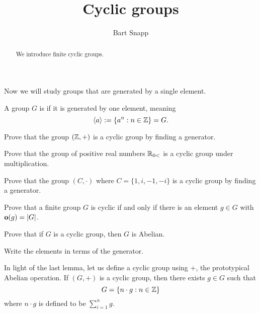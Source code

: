 \documentclass{ximera}
\author{Bart Snapp}
\title{Cyclic groups}
\begin{document}
\begin{abstract}
  We introduce finite cyclic groups.
\end{abstract}
\maketitle

Now we will study groups that are generated by a single element. 

\begin{definition}
  A group $G$ is  if it is generated by one element,
  meaning
  \[
  \langle a\rangle := \{a^n:n\in \mathbb Z\} = G.
  \]
\end{definition}


\begin{exercise}
  Prove that the group $(\mathbb Z,+)$ is a cyclic group by finding a
  generator.
\end{exercise}

\begin{exercise}
  Prove that the group of positive real numbers $\mathbb R_{0<}$ is a cyclic
  group under multiplication.
\end{exercise}


\begin{exercise}
  Prove that the group $(C,\cdot)$ where $C=\{1,i,-1,-i\}$ is a cyclic
  group by finding a generator.
\end{exercise}


\begin{exercise}
  Prove that a finite group $G$ is cyclic if and only if there is an element
  $g\in G$ with $\mathbf o(g) = |G|$.
\end{exercise}



\begin{lemma}
  Prove that if $G$ is a cyclic group, then $G$ is Abelian.
  \begin{sketch}
    Write the elements in terms of the generator.
  \end{sketch}
\end{lemma}

In light of the last lemma, let us define a cyclic group using $+$, the
prototypical Abelian operation. If $(G,+)$ is a cyclic group, then
there exists $g\in G$ such that
\[
G = \{n\cdot g: n\in \mathbb Z\}
\]
where $n\cdot g$ is defined to be $\sum_{i=1}^n g$.
\end{document}
